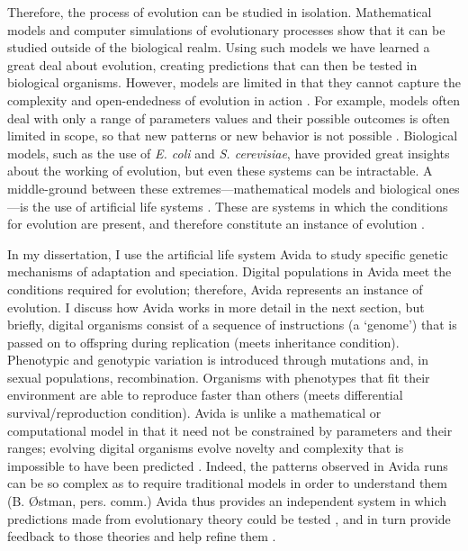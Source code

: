 \begin{doublespace}
Therefore, the process of evolution can be studied in isolation.
%
Mathematical models and computer simulations of evolutionary processes
show that it can be studied outside of the biological realm.
%
Using such models we have learned a great deal about evolution,
creating predictions that can then be tested in biological organisms.
%
However, models are limited in that they cannot capture
the complexity and open-endedness of evolution in action \citep{yed01}.
%
For example, models often deal with only a range of parameters values
and their possible outcomes is often limited in scope,
so that new patterns or new behavior is not possible \citep{yed01}.
%
Biological models, such as the use of \emph{E. coli} and \emph{S. cerevisiae},
have provided great insights about the working of evolution,
but even these systems can be intractable.
%
A middle-ground between these extremes---mathematical models
and biological ones---is the use of artificial life systems \citep{yed01}.
%
These are systems in which the conditions for evolution are present,
and therefore constitute an instance of evolution \citep{pen07}.



In my dissertation, I use the artificial life system Avida \citep{ofr04}
to study specific genetic mechanisms of adaptation and speciation.
%
Digital populations in Avida meet the conditions required for evolution;
therefore, Avida represents an instance of evolution.
%
I discuss how Avida works in more detail in the next section, but briefly,
digital organisms consist of a sequence of instructions (a `genome')
that is passed on to offspring during replication (meets inheritance condition).
%
Phenotypic and genotypic variation is introduced through mutations
and, in sexual populations, recombination.
%
Organisms with phenotypes that fit their environment
are able to reproduce faster than others
(meets differential survival/reproduction condition).
%
Avida is unlike a mathematical or computational model
in that it need not be constrained by parameters and their ranges;
evolving digital organisms evolve novelty and complexity
that is impossible to have been predicted \citep{yed01,wil02}.
%
Indeed, the patterns observed in Avida runs can be so complex
as to require traditional models in order to understand them
(B. \O stman, pers. comm.)
%
Avida thus provides an independent system in which predictions
made from evolutionary theory could be tested \citep{yed01},
and in turn provide feedback to those theories
and help refine them \citep{wil02}.



\end{doublespace}
